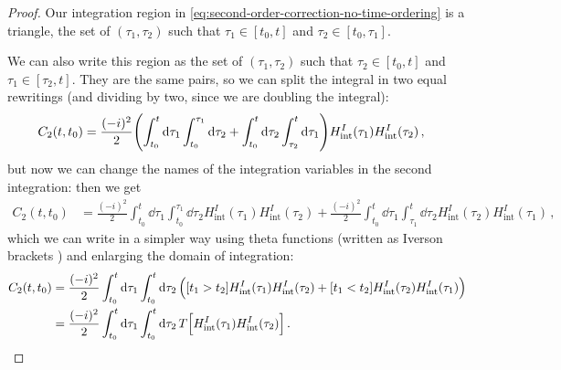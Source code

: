 \documentclass[main.tex]{subfiles}
\begin{document}
\begin{proof}
Our integration region in \eqref{eq:second-order-correction-no-time-ordering} is a triangle, the set of \((\tau_1 , \tau_2 )\) such that \(\tau_1 \in [t_0 , t]\) and \(\tau_2 \in [t_0, \tau_1 ]\). 

We can also write this region as the set of \((\tau_1 , \tau_2 )\) such that \(\tau_2 \in [t_0 , t]\) and \(\tau_1 \in [\tau_2, t]\). They are the same pairs, so we can split the integral in two equal rewritings (and dividing by two, since we are doubling the integral): 
%
\begin{align}
C_2 (t, t_0 )
&= \frac{(-i)^2}{2} \qty(\int_{t_0}^{t} \dd{\tau_1 } \int_{t_0 }^{\tau_1 } \dd{\tau_2 }
+ \int_{t_0 }^{t} \dd{\tau_2 } \int_{\tau_2}^{t} \dd{\tau_1 }
)
H _{\text{int}}^{I} (\tau_1 ) 
H _{\text{int}}^{I} (\tau_2 ) 
\,,
\end{align}
%
but now we can change the names of the integration variables in the second integration: then we get 
%
\begin{align}
C_2 (t, t_0 )
&= \frac{(-i)^2}{2} \int_{t_0}^{t} \dd{\tau_1 } \int_{t_0 }^{\tau_1 } \dd{\tau_2 }
H _{\text{int}}^{I} (\tau_1 )
H _{\text{int}}^{I} (\tau_2 )
+ \frac{(-i)^2}{2} \int_{t_0 }^{t} \dd{\tau_1 } \int_{\tau_1}^{t} \dd{\tau_2 }
H _{\text{int}}^{I} (\tau_2 )
H _{\text{int}}^{I} (\tau_1 )
\,,
\end{align}
%
which we can write in a simpler way using theta functions (written as Iverson brackets \cite[]{knuthTwoNotesNotation1992}) and enlarging the domain of integration: 
%
\begin{align}
C_2 (t, t_0 ) &=
\frac{(-i)^2}{2} \int_{t_0 }^{t} \dd{\tau_1 } \int_{t_0 }^{t} \dd{\tau_2 
}
\qty([t_1 > t_2  ] H _{\text{int}}^{I} (\tau_1 )
H _{\text{int}}^{I} (\tau_2 ) 
+ [t_1 < t_2 ] H _{\text{int}}^{I} (\tau_2 )
H _{\text{int}}^{I} (\tau_1 ) )  \\
&= \frac{(-i)^2}{2} \int_{t_0 }^{t} \dd{\tau_1 } \int_{t_0 }^{t} \dd{\tau_2 }
T \qty[H _{\text{int}}^{I} (\tau_1 )
H _{\text{int}}^{I} (\tau_2 )]
\,.
\end{align}
\end{proof}
\end{document}
